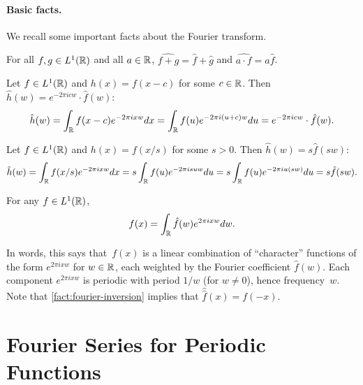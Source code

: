 \documentclass[11pt]{article}
\begin{document}
 

\paragraph{Basic facts.}

We recall some important facts about the Fourier transform.

\begin{fact}[Linearity]
  \label{fact:linear}
  For all $f,g \in L^1(\mathbb{R})$ and all $a \in \mathbb{R}$,
  $\widehat{f + g} = \hat{f} + \hat{g}$ and
  $\widehat{a \cdot f} = a\hat{f}$.
\end{fact}

\begin{fact}
  \label{fact:shift}
  Let $f \in L^{1}(\mathbb{R})$ and $h(x) = f(x - c)$ for some $c \in \mathbb{R}$.
  Then $\hat{h}(w) = e^{-2\pi i c w} \cdot \hat{f}(w)$:
  \[ \hat{h}(w) = \int_{\mathbb{R}} f(x-c)e^{-2\pi i xw}dx = \int_{\mathbb{R}} f(u)
    e^{-2\pi i(u + c)w} du = e^{-2\pi i c w} \cdot \hat{f}(w) . \]
\end{fact}

\begin{fact}
  \label{fact:scale}
  Let $f \in L^{1}(\mathbb{R})$ and $h(x) = f(x/s)$ for some $s > 0$. Then
  $\hat{h}(w) = s \hat{f}(s w)$:
  \[ \hat{h}(w) = \int_{\mathbb{R}} f(x/s) e^{-2\pi i x w} dx = s
    \int_{\mathbb{R}} f(u) e^{-2\pi i s u w} du = s \int_{\mathbb{R}}
    f(u) e^{-2\pi i u (s w)} du = s \hat{f}(s w) . \]
\end{fact}

\begin{fact}
  \label{fact:fourier-inversion}
  For any $f \in L^{1}(\mathbb{R})$,
  \[ f(x) = \int_{\mathbb{R}} \hat{f}(w) e^{2\pi i x w} dw . \]
\end{fact}
In words, this says that~$f(x)$ is a linear combination of
``character'' functions of the form $e^{2\pi i x w}$ for $w \in \mathbb{R}$,
each weighted by the Fourier coefficient $\hat{f}(w)$. Each component
$e^{2\pi i x w}$ is periodic with period $1/w$ (for $w \neq 0$), hence
frequency~$w$. Note that \cref{fact:fourier-inversion} implies that
$\hat{\hat{f}}(x) = f(-x)$.

\section{Fourier Series for Periodic Functions}
\label{sec:fseries}
\end{document}
